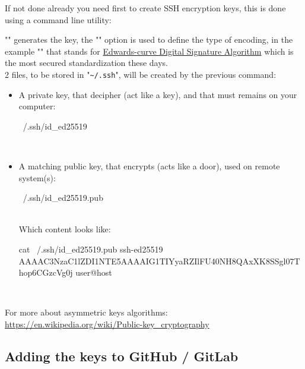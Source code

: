 If not done already you need first to create SSH encryption keys, this is done using a command line utility: 
\begin{script}
\fprompt{~}   
\end{script}
"" generates the key, the "" option is used to define the type of encoding, in the example "" that stands for \href{https://en.wikipedia.org/wiki/EdDSA}{Edwards-curve Digital Signature Algorithm} which is the most secured standardization these days.  \\
2 files, to be stored in "\texttt{\textasciitilde/.ssh}", will be created by the previous command:
\begin{itemize}
\item A private key, that decipher (act like a key), and that must remains on your computer: 
\begin{scripti}
~/.ssh/id\_ed25519
\end{scripti} \\
\vspace{-1.5cm}
\item A matching public key, that encrypts (acts like a door), used on remote system(s):
\begin{scripti}
~/.ssh/id\_ed25519.pub
\end{scripti} \\[-0.65cm]
\noindent Which content looks like: 
{\scriptsize{
\begin{scripti}
\fprompt{~} cat ~/.ssh/id\_ed25519.pub
ssh-ed25519 AAAAC3NzaC1lZDI1NTE5AAAAIG1TIYyaRZIlFU40NH8QAxXK8SSgl07Thop6CGzcVg0j user@host
\end{scripti}}} \\
\vspace{-1.5cm}
\end{itemize}
For more about asymmetric keys algorithms: \href{https://en.wikipedia.org/wiki/Public-key\_cryptography}{https://en.wikipedia.org/wiki/Public-key\_cryptography}
\newpage

\subsection{Adding the keys to GitHub / GitLab}

